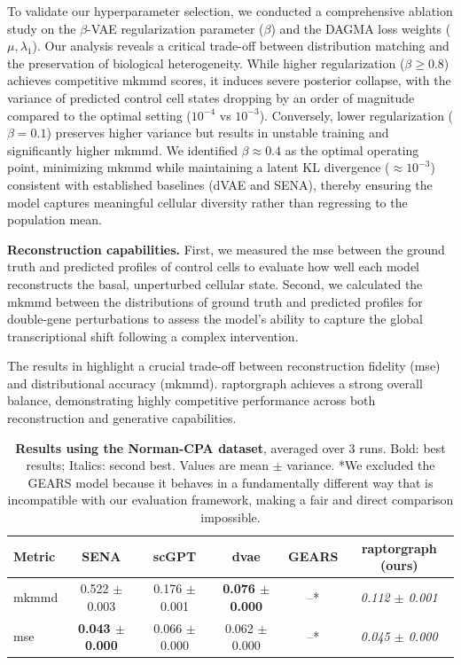 \documentclass[10pt,letterpaper]{article}
\theoremstyle{definition}
\theoremstyle{remark}
\begin{document}
To validate our hyperparameter selection, we conducted a comprehensive ablation study on the $\beta$-VAE regularization parameter ($\beta$) and the DAGMA loss weights ($\mu, \lambda_1$).
Our analysis reveals a critical trade-off between distribution matching and the preservation of biological heterogeneity.
While higher regularization ($\beta \geq 0.8$) achieves competitive \gls{mkmmd} scores, it induces severe posterior collapse, with the variance of predicted control cell states dropping by an order of magnitude compared to the optimal setting ($10^{-4}$ vs $10^{-3}$).
Conversely, lower regularization ($\beta = 0.1$) preserves higher variance but results in unstable training and significantly higher \gls{mkmmd}.
We identified $\beta \approx 0.4$ as the optimal operating point, minimizing \gls{mkmmd} while maintaining a latent KL divergence ($\approx 10^{-3}$) consistent with established baselines (dVAE and SENA), thereby ensuring the model captures meaningful cellular diversity rather than regressing to the population mean.

\textbf{Reconstruction capabilities.} First, we measured the \gls{mse} between the ground truth and predicted profiles of control cells to evaluate how well each model reconstructs the basal, unperturbed cellular state.
Second, we calculated the \gls{mkmmd} between the distributions of ground truth and predicted profiles for double-gene perturbations to assess the model's ability to capture the global transcriptional shift following a complex intervention.

The results in  highlight a crucial trade-off between reconstruction fidelity (\gls{mse}) and distributional accuracy (\gls{mkmmd}).
\Gls{raptorgraph} achieves a strong overall balance, demonstrating highly competitive performance across both reconstruction and generative capabilities.

\begin{table}[!ht]
\centering
\caption{\textbf{Results using the Norman-CPA dataset}, averaged over 3 runs. Bold: best results; Italics: second best. Values are mean $\pm$ variance.
*We excluded the GEARS model because it behaves in a fundamentally different way that is incompatible with our evaluation framework, making a fair and direct comparison impossible.}
\begin{tabular}{lccccc}
\toprule
{Metric} & {SENA} & {scGPT} & {\gls{dvae}} & {GEARS} & {\gls{raptorgraph}} (ours) \\
\midrule
\gls{mkmmd} & 0.522 $\pm$ 0.003 & 0.176 $\pm$ 0.001 & \textbf{0.076 $\pm$ 0.000} & {--}* & \textit{0.112 $\pm$ 0.001} \\
\gls{mse} & \textbf{0.043 $\pm$ 0.000} & 0.066 $\pm$ 0.000 & 0.062 $\pm$ 0.000 & {--}* & \textit{0.045 $\pm$ 0.000} \\
\bottomrule
\end{tabular}
\label{tab:MMD_results}
\end{table}
\end{document}
